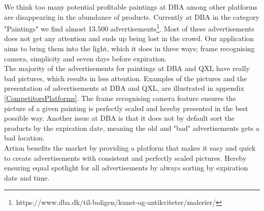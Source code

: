 We think too many potential profitable paintings at DBA among other platforms are disappearing in the abundance of products. Currently at DBA in the category "Paintings" we find almost 13.500 advertisements\footnote{https://www.dba.dk/til-boligen/kunst-og-antikviteter/malerier/}. Most of these advertisements does not get any attention and ends up being lost in the crowd. Our application aims to bring them into the light, which it does in three ways; frame recognising camera, simplicity and seven days before expiration.\\ 
\forceindent The majority of the advertisements for paintings at DBA and QXL have really bad pictures, which results in less attention. Examples of the pictures and the presentation of advertisements at DBA and QXL, are illustrated in appendix \ref{CompetitorsPlatforms}. The frame recognising camera feature ensures the picture of a given painting is perfectly scaled and hereby presented in the best possible way. Another issue at DBA is that it does not by default sort the products by the expiration date, meaning the old and "bad" advertisements gets a bad location. \\

Artion benefits the market by providing a platform that makes it easy and quick to create advertisements with consistent and perfectly scaled pictures. Hereby ensuring equal spotlight for all advertisements by always sorting by expiration date and time. 